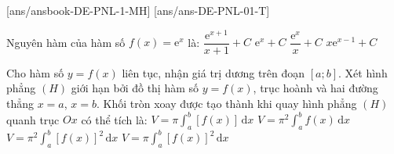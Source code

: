 [ans/ansbook-DE-PNL-1-MH]
\TN
{}[ans/ans-DE-PNL-01-T]


\begin{ex}%
    Nguyên hàm của hàm số $f(x) = \mathrm{e}^x$ là:
    \choice
    {$\dfrac{\mathrm{e}^{x+1}}{x+1} + C$}
    {\True $\mathrm{e}^x + C$}
    {$\dfrac{\mathrm{e}^x}{x} + C$}
    {$x \mathrm{e}^{x-1} + C$}
\end{ex}

\begin{ex}%
    Cho hàm số $y = f(x)$ liên tục, nhận giá trị dương trên đoạn $[a;b]$. Xét hình phẳng $(H)$ giới hạn bởi đồ thị hàm số $y = f(x)$, trục hoành và hai đường thẳng $x = a$, $x = b$. Khối tròn xoay được tạo thành khi quay hình phẳng $(H)$ quanh trục $Ox$ có thể tích là:
    \choice
    {$V = \pi \displaystyle \int_a^b [f(x)] \mathrm{\,d}x$}
    {$V = \pi^2 \displaystyle \int_a^b f(x) \mathrm{\,d}x$}
    {$V = \pi^2 \displaystyle \int_a^b [f(x)]^2 \mathrm{\,d}x$}
    {\True $V = \pi \displaystyle \int_a^b [f(x)]^2 \mathrm{\,d}x$}
\end{ex}

